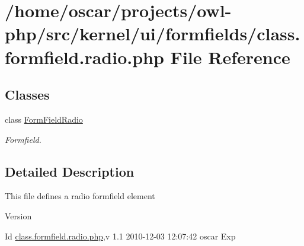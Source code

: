 \section{/home/oscar/projects/owl-\/php/src/kernel/ui/formfields/class.formfield.radio.php File Reference}
\label{class_8formfield_8radio_8php}
\subsection*{Classes}
\begin{DoxyCompactItemize}
\item 
class \hyperlink{classFormFieldRadio}{FormFieldRadio}
\begin{DoxyCompactList}\small\item\em Formfield. \item\end{DoxyCompactList}\end{DoxyCompactItemize}


\subsection{Detailed Description}
This file defines a radio formfield element \begin{DoxyVersion}{Version}

\end{DoxyVersion}
\begin{DoxyParagraph}{Id}
\hyperlink{class_8formfield_8radio_8php}{class.formfield.radio.php},v 1.1 2010-\/12-\/03 12:07:42 oscar Exp 
\end{DoxyParagraph}
